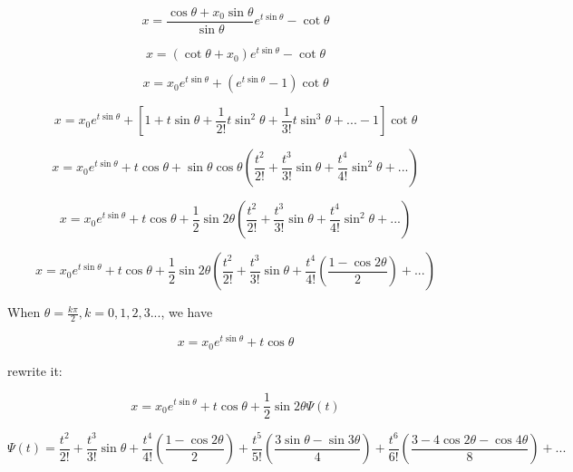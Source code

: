 \documentclass{article}
\begin{document}
\begin{equation}
   x = \frac{\cos \theta + x_0 \sin \theta}{\sin \theta} e^{t \sin \theta} - \cot \theta
\end{equation}

\begin{equation}
   x = (\cot \theta + x_0) e^{t \sin \theta} - \cot \theta
\end{equation}

\begin{equation}
   x =  x_0 e^{t \sin \theta} + (e^{t \sin \theta} - 1) \cot \theta
\end{equation}

\begin{equation}
   x =  x_0 e^{t \sin \theta} + [1 + t \sin \theta + \frac{1}{2!} t\sin^2 \theta  + \frac{1}{3!} t \sin^3 \theta + ... - 1] \cot \theta
\end{equation}

\begin{equation}
   x =  x_0 e^{t \sin \theta} + t \cos \theta + \sin \theta \cos \theta (\frac{t^2}{2!} + \frac{t^3}{3!} \sin \theta + \frac{t^4}{4!} \sin^2 \theta + ...)
\end{equation}

\begin{equation}
   x =  x_0 e^{t \sin \theta} + t \cos \theta + \frac{1}{2} \sin 2\theta (\frac{t^2}{2!} + \frac{t^3}{3!} \sin \theta + \frac{t^4}{4!} \sin^2 \theta + ...)
\end{equation}

\begin{equation}
   x =  x_0 e^{t \sin \theta} + t \cos \theta + \frac{1}{2} \sin 2\theta (\frac{t^2}{2!} + \frac{t^3}{3!} \sin \theta + \frac{t^4}{4!} (\frac{1 - \cos 2\theta}{2}) + ...)
\end{equation}

When $\theta = \frac{k \pi}{2}, k = 0, 1, 2, 3...$, we have

\begin{equation}
    x = x_0 e^{t \sin \theta} + t \cos \theta
\end{equation}

rewrite it:

\begin{equation}
   x =  x_0 e^{t \sin \theta} + t \cos \theta + \frac{1}{2} \sin 2\theta \Psi(t)
\end{equation}

\begin{equation}
   \Psi(t) =  \frac{t^2}{2!} + \frac{t^3}{3!} \sin \theta + \frac{t^4}{4!} (\frac{1 - \cos 2\theta}{2}) + \frac{t^5}{5!} (\frac{3 \sin \theta - \sin 3\theta}{4}) + \frac{t^6}{6!} (\frac{3 - 4 \cos 2\theta - \cos 4\theta}{8}) + ...
\end{equation}
\end{document}
